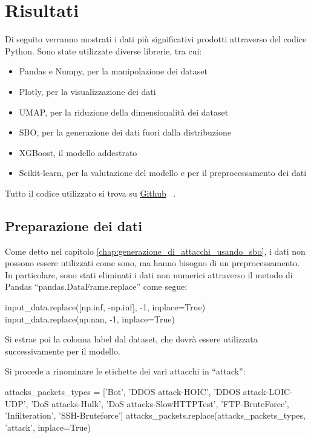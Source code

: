 \chapter{Risultati}
\label{chap:risultati}

Di seguito verranno mostrati i dati più significativi prodotti attraverso del codice Python. Sono state utilizzate diverse librerie, tra cui:

\begin{itemize}
   \item Pandas e Numpy, per la manipolazione dei dataset
    \item Plotly, per la visualizzazione dei dati
    \item UMAP, per la riduzione della dimensionalità dei dataset 
    \item SBO, per la generazione dei dati fuori dalla distribuzione
    \item XGBoost, il modello addestrato
    \item Scikit-learn, per la valutazione del modello e per il preprocessamento dei dati
\end{itemize}

Tutto il codice utilizzato si trova su \href{https://github.com/guglielmobartelloni/thesis-utils}{Github}~\cite{github} .

\section{Preparazione dei dati}

Come detto nel capitolo \ref{chap:generazione_di_attacchi_usando_sbo}, i dati non possono essere utilizzati come sono, ma hanno bisogno di un preprocessamento. In particolare, sono stati eliminati i dati non numerici attraverso il metodo di Pandas ``pandas.DataFrame.replace'' come segue:


\begin{python}
input_data.replace([np.inf, -np.inf], -1, inplace=True)
input_data.replace(np.nan, -1, inplace=True)
\end{python}

Si estrae poi la colonna label dal dataset, che dovrà essere utilizzata successivamente per il modello.

Si procede a rinominare le etichette dei vari attacchi in ``attack'':

\begin{python}
attacks_packets_types = ['Bot', 'DDOS attack-HOIC', 'DDOS attack-LOIC-UDP',
                          'DoS attacks-Hulk', 'DoS attacks-SlowHTTPTest', 
                          'FTP-BruteForce', 
                          'Infilteration', 'SSH-Bruteforce']
attacks_packets.replace(attacks_packets_types, 'attack', inplace=True)
\end{python}

